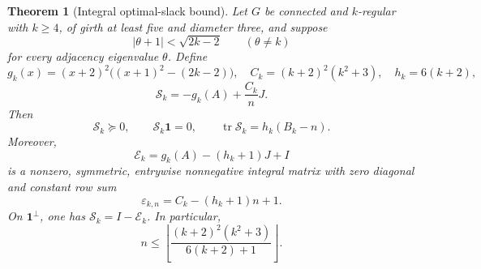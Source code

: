 \documentclass[a4paper,10pt,reqno]{amsart}
\theoremstyle{plain}
\newtheorem{theorem}{Theorem}[section]
\theoremstyle{definition}
\theoremstyle{remark}
\newcommand{\one}{\mathbf 1}
\newcommand{\tr}{\operatorname{tr}}
\newcommand{\resultbox}[1]{\boxed{#1}}
\begin{document}
\begin{theorem}[Integral optimal-slack bound]\label{thm:integral-slack}
Let \(G\) be connected and \(k\)-regular with \(k\ge4\), of girth at least
five and diameter three, and suppose
\[
 \lvert\theta+1\rvert<\sqrt{2k-2}
 \qquad(\theta\ne k)
\]
for every adjacency eigenvalue \(\theta\).  Define
\[
 g_k(x)=(x+2)^2\bigl((x+1)^2-(2k-2)\bigr),\quad
 C_k=(k+2)^2(k^2+3),\quad h_k=6(k+2),
\]
\[
 \mathcal S_k=-g_k(A)+\frac{C_k}{n}J.
\]
Then
\[
 \mathcal S_k\succeq0,\qquad
 \mathcal S_k\one=0,\qquad
 \tr\mathcal S_k=h_k(B_k-n).
\]
Moreover,
\[
 \mathcal E_k=g_k(A)-(h_k+1)J+I
\]
is a nonzero, symmetric, entrywise nonnegative integral matrix with zero
diagonal and constant row sum
\[
 \varepsilon_{k,n}=C_k-(h_k+1)n+1.
\]
On \(\one^\perp\), one has \(\mathcal S_k=I-\mathcal E_k\).  In particular,
\[
 \resultbox{
 n\le
 \left\lfloor
 \frac{(k+2)^2(k^2+3)}{6(k+2)+1}
 \right\rfloor.
 }
\]
\end{theorem}
\end{document}

